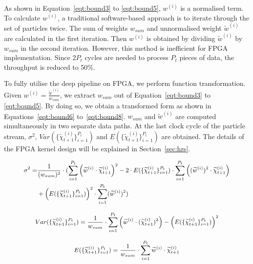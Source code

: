 As shown in Equation~\ref{eqt:bound3} to \ref{eqt:bound5}, ${w}^{(i)}$ is a normalised term. 
To calculate $w^{(i)}$, a traditional software-based approach is to iterate through the set of particles twice.
The sum of weights $w_{sum}$ and unnormalised weight $\widetilde{w}^{(i)}$ are calculated in the first iteration.
Then $w^{(i)}$ is obtained by dividing $\widetilde{w}^{(i)}$ by $w_{sum}$ in the second iteration.
However, this method is inefficient for FPGA implementation.
Since $2P_t$ cycles are needed to process $P_t$ pieces of data, the throughput is reduced to 50\%.

To fully utilise the deep pipeline on FPGA, we perform function transformation.
Given ${w}^{(i)} = \frac{\widetilde{w}^{(i)}}{w_{sum}}$, we extract $w_{sum}$ out of Equation~\ref{eqt:bound3} to \ref{eqt:bound5}.
By doing so, we obtain a transformed form as shown in Equations~\ref{eqt:bound6} to~\ref{eqt:bound8}.
$w_{sum}$ and $\widetilde{w}^{(i)}$ are computed simultaneously in two separate data paths.
At the last clock cycle of the particle stream, $\sigma^2$, $Var(\{\widetilde{\chi}_{t+1}^{(i)}\}^{P_t}_{i=1})$ and $E(\{\widetilde{\chi}_{t+1}^{(i)}\}^{P_t}_{i=1})$ are obtained.
The details of the FPGA kernel design will be explained in Section~\ref{sec:hrs}.

\begin{eqnarray}
\small
\begin{aligned}
\sigma^2 = & \frac{1}{(w_{sum})^2} \cdot ( \sum_{i=1}^{P_{t}}\left(\widetilde{w}^{(i)} \cdot \widetilde{\chi}_{t+1}^{(i)} \right)^2 - 2 \cdot E(\{\widetilde{\chi}_{t+1}^{(i)}\}^{P_t}_{i=1}) \cdot \sum_{i=1}^{P_{t}} \left ( (\widetilde{w}^{(i)})^2 \cdot \widetilde{\chi}_{t+1}^{(i)} \right )\\
& + \left(E(\{\widetilde{\chi}_{t+1}^{(i)}\}^{P_t}_{i=1})\right)^2 \cdot \sum_{i=1}^{P_{t}}(\widetilde{w}^{(i)})^2 )
\end{aligned}
\label{eqt:bound6}
\end{eqnarray}

\begin{equation}
\small
\begin{aligned}
Var(\{\widetilde{\chi}_{t+1}^{(i)}\}^{P_t}_{i=1}) = \frac{1}{w_{sum}} \cdot \sum_{i=1}^{P_{t}} \left ( \widetilde{w}^{(i)} \cdot (\widetilde{\chi}_{t+1}^{(i)})^2 \right ) - \left( E(\{\widetilde{\chi}_{t+1}^{(i)}\}^{P_t}_{i=1}) \right)^2
\end{aligned}
\label{eqt:bound7}
\end{equation}

\begin{equation}
\small
\begin{aligned}
E(\{\widetilde{\chi}_{t+1}^{(i)}\}^{P_t}_{i=1}) = \frac{1}{w_{sum}} \cdot \sum_{i=1}^{P_{t}} \widetilde{w}^{(i)} \cdot \widetilde{\chi}_{t+1}^{(i)}
\end{aligned}
\label{eqt:bound8}
\end{equation}

